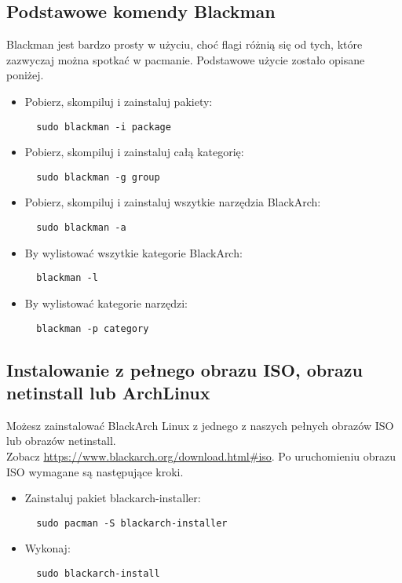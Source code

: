 \documentclass[a4paper, oneside, 11pt]{book}
\begin{document}
\subsection{Podstawowe komendy Blackman} Blackman jest bardzo prosty w użyciu, choć flagi różnią się od tych, które zazwyczaj można spotkać w pacmanie.
Podstawowe użycie zostało opisane poniżej.
\begin{itemize}
\item Pobierz, skompiluj i zainstaluj pakiety:
\begin{lstlisting}
  sudo blackman -i package
\end{lstlisting}

\item Pobierz, skompiluj i zainstaluj całą kategorię:
\begin{lstlisting}
  sudo blackman -g group
\end{lstlisting}

\item Pobierz, skompiluj i zainstaluj wszytkie narzędzia BlackArch:
\begin{lstlisting}
  sudo blackman -a
\end{lstlisting}

\item By wylistować wszytkie kategorie BlackArch:
\begin{lstlisting}
  blackman -l
\end{lstlisting}

\item By wylistować kategorie narzędzi:
\begin{lstlisting}
  blackman -p category
\end{lstlisting}

\end{itemize}

\subsection{Instalowanie z pełnego obrazu ISO, obrazu netinstall lub ArchLinux}
Możesz zainstalować BlackArch Linux z jednego z naszych pełnych obrazów ISO lub obrazów netinstall.
\\Zobacz \url{https://www.blackarch.org/download.html#iso}.
Po uruchomieniu obrazu ISO wymagane są następujące kroki.
\begin{itemize}
\item Zainstaluj pakiet blackarch-installer:
\begin{lstlisting}
  sudo pacman -S blackarch-installer
\end{lstlisting}

\item Wykonaj:
\begin{lstlisting}
  sudo blackarch-install
\end{lstlisting}

\end{itemize}
\end{document}
